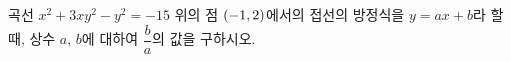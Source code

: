 곡선 $x^2+3xy^2-y^2=-15$ 위의 점 $(-1{,}\mkern3mu\mathopen{}2)$에서의 접선의 방정식을 $y=ax+b$라 할 때, 상수 $a$, $b$에 대하여 $\dfrac{b}{a}$의 값을 구하시오.
